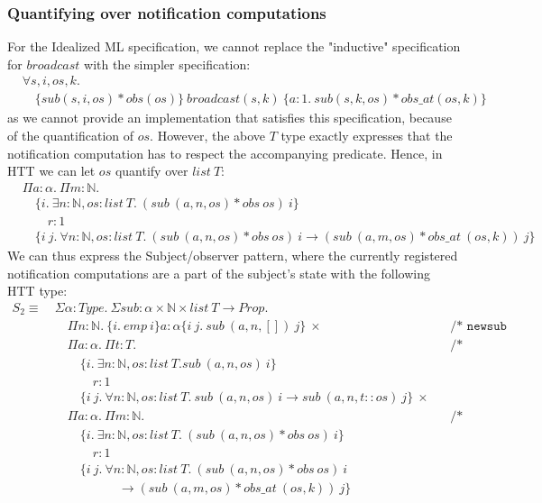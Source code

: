 \documentclass[a4paper,english]{article}
\newcommand{\N}[0]{\mathbb{N}}
\newcommand{\HPROP}[0]{Prop}
\newcommand{\TYPE}[0]{Type}
\newcommand{\LIST}[0]{list}
\newcommand{\pname}[1]{\texttt{/* #1 */}}
\begin{document}
\subsubsection{Quantifying over notification computations}
For the Idealized ML specification, we cannot replace the "inductive"
specification for $broadcast$ with the simpler specification:
\begin{align*}
&\forall s, i, os, k.\\
&\quad\{ sub(s, i, os) * obs(os) \}\ broadcast(s, k)\ \{ a : 1.\ sub(s, k, os)
* obs\_at(os, k) \}
\end{align*}
as we cannot provide an implementation that satisfies this specification,
because of the quantification of $os$. However, the above $T$ type exactly
expresses that the notification computation has to respect the accompanying
predicate. Hence, in HTT we can let $os$ quantify over $list\ T$:
\begin{align*}
&\Pi a : \alpha.\ \Pi m : \N.\\
&\quad\{ i.\ \exists n : \N, os : list\ T.\ (sub\ (a, n, os) * obs\ os)\ i \}\\
&\quad\quad r : 1\\
&\quad \{ i\ j.\ \forall n : \N, os : list\ T.\ (sub\ (a, n, os) * obs\ os)\ i \rightarrow (sub\ (a, m, os) * obs\_at\ (os, k))\ j \} 
\end{align*}
We can thus express the Subject/observer pattern, where the currently
registered notification computations are a part of the subject's state with the
following HTT type:
\begin{align*}
S_2 \equiv\ &\Sigma \alpha : \TYPE.\ \Sigma sub : \alpha \times \N \times \LIST\ T
\rightarrow \HPROP.\\
&\quad \Pi n : \N.\ \{ i.\ emp\ i \} a : \alpha \{ i\ j.\ sub\ (a, n, [])\ j \}\ \times && \pname{newsub}\\
&\quad \Pi a : \alpha.\ \Pi t : T. && \pname{register}\\
&\quad\quad\{ i.\ \exists n : \N, os : list\ T. sub\ (a, n, os)\ i \}\\
&\quad\quad\quad r : 1\\
&\quad\quad \{ i\ j.\ \forall n : \N, os : list\ T.\ sub\ (a, n, os)\ i \rightarrow sub\ (a, n, t::os)\ j
\}\ \times\\
&\quad \Pi a : \alpha.\ \Pi m : \N. && \pname{broadcast}\\
&\quad\quad\{ i.\ \exists n : \N, os : list\ T.\ (sub\ (a, n, os) * obs\ os)\ i \}\\
&\quad\quad\quad r : 1\\
&\quad\quad \{ i\ j.\ \forall n : \N, os : list\ T.\ (sub\ (a, n, os) * obs\ os)\ i\\
&\quad\quad\quad\quad\quad \rightarrow (sub\ (a, m, os) * obs\_at\ (os, k))\ j \}
\end{align*}
\end{document}

